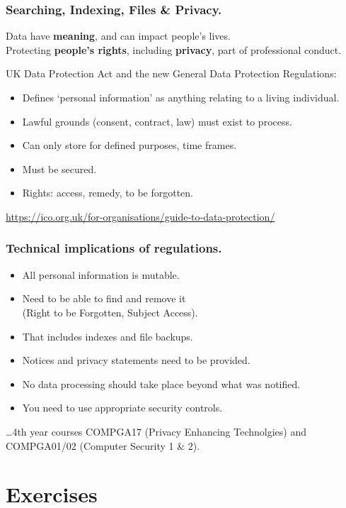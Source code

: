 \documentclass{beamer} %
\newcommand\emc[1]{\textcolor{brightblue}{\textbf{#1}}}
\begin{document}
\begin{frame}
\frametitle{Searching, Indexing, Files \& Privacy.}

Data have \emc{meaning}, and can impact people's lives.\\
Protecting \emc{people's rights}, including \emc{privacy}, part of professional conduct.

\vspace{3mm}
UK Data Protection Act and the new General Data Protection Regulations:
\begin{itemize}
	\item Defines `personal information' as anything relating to a living individual.
	\item Lawful grounds (consent, contract, law) must exist to process.
	\item Can only store for defined purposes, time frames.
	\item Must be secured.
	\item Rights: access, remedy, to be forgotten.
\end{itemize}

{\small \url{https://ico.org.uk/for-organisations/guide-to-data-protection/}}

\end{frame}


\begin{frame}
\frametitle{Technical implications of regulations.}

\begin{itemize}
	\item All personal information is mutable.
	\item Need to be able to find and remove it \\ (Right to be Forgotten, Subject Access).
	\item That includes indexes and file backups.
	\item Notices and privacy statements need to be provided.
	\item No data processing should take place beyond what was notified.
	\item You need to use appropriate security controls.
\end{itemize}
\ldots 4th year courses COMPGA17 (Privacy Enhancing Technolgies) and COMPGA01/02 (Computer Security 1 \& 2).

\end{frame}

\section{Exercises}
\end{document}
